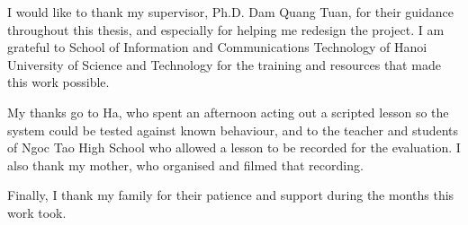 I would like to thank my supervisor, Ph.D. Dam Quang Tuan, for their guidance throughout this thesis, and especially for helping me redesign the project. I am grateful to School of Information and Communications Technology of Hanoi University of Science and Technology for the training and resources that made this work possible.

My thanks go to Ha, who spent an afternoon acting out a scripted lesson so the system could be tested against known behaviour, and to the teacher and students of Ngoc Tao High School who allowed a lesson to be recorded for the evaluation. I also thank my mother, who organised and filmed that recording.

Finally, I thank my family for their patience and support during the months this work took.
